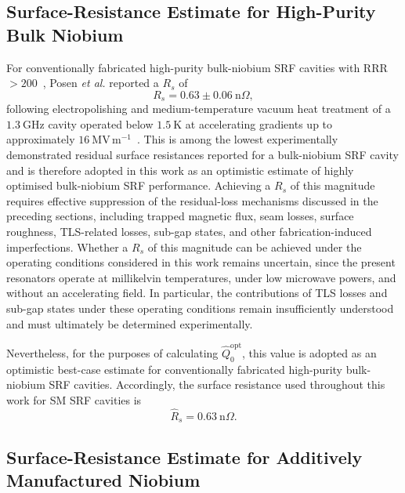 \documentclass[
  aps,
  physrev,
  reprint,
  superscriptaddress,
  nofootinbib,
  amsmath,
  amssymb
]{revtex4-2}
\begin{document}
\subsection[\appendixname~\thesubsection]{Surface-Resistance Estimate for High-Purity Bulk Niobium}
\label{app:Rs_hh_Nb_SRF}

For conventionally fabricated high-purity bulk-niobium SRF cavities with RRR $>200$~\cite{Ciovati2018,Ciovati2007}, Posen \textit{et al.} reported a $R_s$ of
\begin{equation}
    R_s = 0.63 \pm 0.06~\mathrm{n}\Omega,
\end{equation}
following electropolishing and medium-temperature vacuum heat treatment of a $1.3~\mathrm{GHz}$ cavity operated below $1.5~\mathrm{K}$ at accelerating gradients up to approximately $16~\mathrm{MV\,m^{-1}}$~\cite{Posen2020}. This is among the lowest experimentally demonstrated residual surface resistances reported for a bulk-niobium SRF cavity and is therefore adopted in this work as an optimistic estimate of highly optimised bulk-niobium SRF performance. Achieving a $R_s$ of this magnitude requires effective suppression of the residual-loss mechanisms discussed in the preceding sections, including trapped magnetic flux, seam losses, surface roughness, TLS-related losses, sub-gap states, and other fabrication-induced imperfections. Whether a $R_s$ of this magnitude can be achieved under the operating conditions considered in this work remains uncertain, since the present resonators operate at millikelvin temperatures, under low microwave powers, and without an accelerating field. In particular, the contributions of TLS losses and sub-gap states under these operating conditions remain insufficiently understood and must ultimately be determined experimentally.

Nevertheless, for the purposes of calculating $\hat Q_0^{\mathrm{opt}}$, this value is adopted as an optimistic best-case estimate for conventionally fabricated high-purity bulk-niobium SRF cavities. Accordingly, the surface resistance used throughout this work for SM SRF cavities is
\begin{equation}
\boxed{\hat{R}_s = 0.63~\mathrm{n}\Omega.}
\end{equation}


\subsection[\appendixname~\thesubsection]{Surface-Resistance Estimate for Additively Manufactured Niobium}
\label{app:Rs_3D_Nb_SRF}
\end{document}

